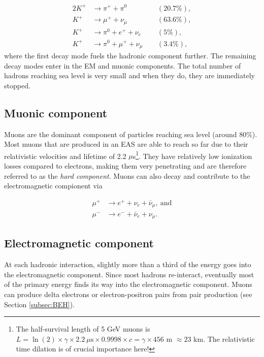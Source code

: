 \begin{alignat}{2}
K^+ &\rightarrow \pi^+ + \pi^0  &&(20.7\%),\nonumber \\
K^+ &\rightarrow \mu^+ + \nu_{\mu}  &&(63.6\%),\nonumber \\
K^+ &\rightarrow \pi^0 + e^+ + \nu_e  &&(5\%),\nonumber \\
K^+ &\rightarrow \pi^0 + \mu^+ + \nu_{\mu}  \ \ &&(3.4\%), \label{eq:hadronic} 
\end{alignat} 
where the first decay mode fuels the hadronic component further. The remaining decay modes enter in the EM and muonic components. The total number of hadrons reaching sea level is very small and when they do, they are immediately stopped.

\subsection{Muonic component}
Muons are the dominant component of particles reaching sea level (around 80\%). Most muons that are produced in an EAS are able to reach so far due to their relativistic velocities and lifetime of 2.2 $\mu$s\footnote{The half-survival length of 5 GeV muons is $L = \ln(2) \times \gamma \times 2.2 \ \mu\textrm{s} \times 0.9998 \times c = \gamma \times 456$ m $\approx 23$ km. The relativistic time dilation is of crucial importance here!}. They have relatively low ionization losses compared to electrons, making them very penetrating and are therefore referred to as the \textit{hard component}. Muons can also decay and contribute to the electromagnetic compionent via

\begin{equation}
\label{eq:muonic}
\begin{split}
\mu^+ &\rightarrow e^+ + \nu_e + \bar{\nu}_\mu, \ \textrm{and} \\
\mu^- &\rightarrow e^- + \bar{\nu}_e + \nu_\mu.
\end{split}
\end{equation}

\subsection{Electromagnetic component}
At each hadronic interaction, slightly more than a third of the energy goes into the electromagnetic component. Since most hadrons re-interact, eventually most of the primary energy finds its way into the electromagnetic component. Muons can produce delta electrons or electron-positron pairs from pair production (see Section \ref{subsec:BEH}).

